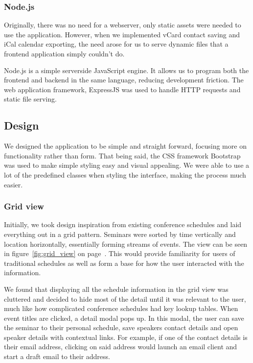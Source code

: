 \documentclass[conference]{IEEEtran}
\begin{document}
\subsubsection{Node.js}
Originally, there was no need for a webserver, only static assets were needed to use the application. However, when we implemented vCard contact saving and iCal calendar exporting, the need arose for us to serve dynamic files that a frontend application simply couldn't do.

Node.js is a simple serverside JavaScript engine. It allows us to program both the frontend and backend in the same language, reducing development friction. The web application framework, ExpressJS was used to handle HTTP requests and static file serving.

\subsection{Design}
We designed the application to be simple and straight forward, focusing more on functionality rather than form. That being said, the CSS framework Bootstrap was used to make simple styling easy and visual appealing. We were able to use a lot of the predefined classes when styling the interface, making the process much easier.

\subsubsection{Grid view}
Initially, we took design inspiration from existing conference schedules and laid everything out in a grid pattern. Seminars were sorted by time vertically and location horizontally, essentially forming streams of events. The view can be seen in figure~\ref{fig:grid_view} on page~\pageref{fig:grid_view}. This would provide familiarity for users of traditional schedules as well as form a base for how the user interacted with the information.

We found that displaying all the schedule information in the grid view was cluttered and decided to hide most of the detail until it was relevant to the user, much like how complicated conference schedules had key lookup tables. When event titles are clicked, a detail modal pops up. In this modal, the user can save the seminar to their personal schedule, save speakers contact details and open speaker details with contextual links. For example, if one of the contact details is their email address, clicking on said address would launch an email client and start a draft email to their address.
\end{document}
